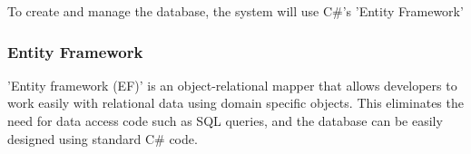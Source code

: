 To create and manage the database, the system will use C\#'s 'Entity Framework'

\subsubsection{Entity Framework}

'Entity framework (EF)' is an object-relational mapper that allows developers to work easily with relational data using domain specific objects. This eliminates the need for data access code such as SQL queries, and the database can be easily designed using standard C\# code.

